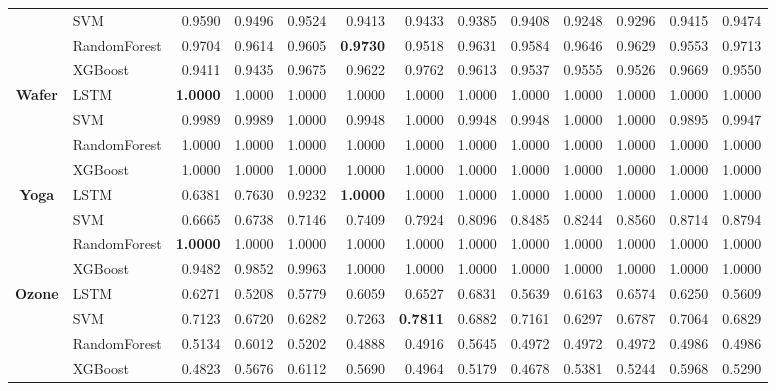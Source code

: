 \begin{table}[h]
\begin{adjustbox}{max width=15cm}
\begin{tabular}{|c|l|r|r|r|r|r|r|r|r|r|r|r|}
				& SVM &  0.9590 &  0.9496 &  0.9524 &  0.9413 &  0.9433 &  0.9385 &  0.9408 &  0.9248 &  0.9296 &  0.9415 &  0.9474 \\
				& RandomForest &  0.9704 &  0.9614 &  0.9605 &  \textbf{0.9730} &  0.9518 &  0.9631 &  0.9584 &  0.9646 &  0.9629 &  0.9553 &  0.9713 \\
				& XGBoost &  0.9411 &  0.9435 &  0.9675 &  0.9622 &  0.9762 &  0.9613 &  0.9537 &  0.9555 &  0.9526 &  0.9669 &  0.9550 \\
				\hline
				\textbf{Wafer} & LSTM &  \textbf{1.0000} &  1.0000 &  1.0000 &  1.0000 &  1.0000 &  1.0000 &  1.0000 &  1.0000 &  1.0000 &  1.0000 &  1.0000 \\
				& SVM &  0.9989 &  0.9989 &  1.0000 &  0.9948 &  1.0000 &  0.9948 &  0.9948 &  1.0000 &  1.0000 &  0.9895 &  0.9947 \\
				& RandomForest &  1.0000 &  1.0000 &  1.0000 &  1.0000 &  1.0000 &  1.0000 &  1.0000 &  1.0000 &  1.0000 &  1.0000 &  1.0000 \\
				& XGBoost &  1.0000 &  1.0000 &  1.0000 &  1.0000 &  1.0000 &  1.0000 &  1.0000 &  1.0000 &  1.0000 &  1.0000 &  1.0000 \\
				\hline
				\textbf{Yoga} & LSTM &  0.6381 &  0.7630 &  0.9232 &  \textbf{1.0000} &  1.0000 &  1.0000 &  1.0000 &  1.0000 &  1.0000 &  1.0000 &  1.0000 \\
				& SVM &  0.6665 &  0.6738 &  0.7146 &  0.7409 &  0.7924 &  0.8096 &  0.8485 &  0.8244 &  0.8560 &  0.8714 &  0.8794 \\
				& RandomForest &  \textbf{1.0000} &  1.0000 &  1.0000 &  1.0000 &  1.0000 &  1.0000 &  1.0000 &  1.0000 &  1.0000 &  1.0000 &  1.0000 \\
				& XGBoost &  0.9482 &  0.9852 &  0.9963 &  1.0000 &  1.0000 &  1.0000 &  1.0000 &  1.0000 &  1.0000 &  1.0000 &  1.0000 \\
				\hline
				\textbf{Ozone} & LSTM &  0.6271 &  0.5208 &  0.5779 &  0.6059 &  0.6527 &  0.6831 &  0.5639 &  0.6163 &  0.6574 &  0.6250 &  0.5609 \\
				& SVM &  0.7123 &  0.6720 &  0.6282 &  0.7263 &  \textbf{0.7811} &  0.6882 &  0.7161 &  0.6297 &  0.6787 &  0.7064 &  0.6829 \\
				& RandomForest &  0.5134 &  0.6012 &  0.5202 &  0.4888 &  0.4916 &  0.5645 &  0.4972 &  0.4972 &  0.4972 &  0.4986 &  0.4986 \\
				& XGBoost &  0.4823 &  0.5676 &  0.6112 &  0.5690 &  0.4964 &  0.5179 &  0.4678 &  0.5381 &  0.5244 &  0.5968 &  0.5290 \\

\end{tabular}
\end{adjustbox}
\end{table}
